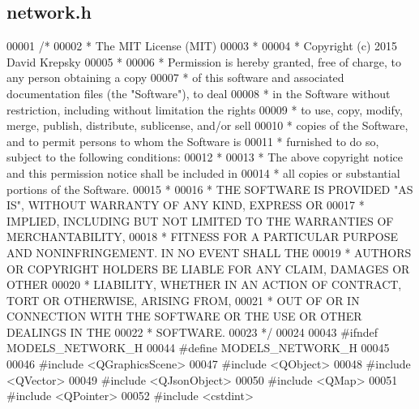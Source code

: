 \hypertarget{network_8h_source}{}\subsection{network.\+h}
\label{network_8h_source}

\begin{DoxyCode}
00001 \textcolor{comment}{/*}
00002 \textcolor{comment}{ * The MIT License (MIT)}
00003 \textcolor{comment}{ *}
00004 \textcolor{comment}{ * Copyright (c) 2015 David Krepsky}
00005 \textcolor{comment}{ *}
00006 \textcolor{comment}{ * Permission is hereby granted, free of charge, to any person obtaining a copy}
00007 \textcolor{comment}{ * of this software and associated documentation files (the "Software"), to deal}
00008 \textcolor{comment}{ * in the Software without restriction, including without limitation the rights}
00009 \textcolor{comment}{ * to use, copy, modify, merge, publish, distribute, sublicense, and/or sell}
00010 \textcolor{comment}{ * copies of the Software, and to permit persons to whom the Software is}
00011 \textcolor{comment}{ * furnished to do so, subject to the following conditions:}
00012 \textcolor{comment}{ *}
00013 \textcolor{comment}{ * The above copyright notice and this permission notice shall be included in}
00014 \textcolor{comment}{ * all copies or substantial portions of the Software.}
00015 \textcolor{comment}{ *}
00016 \textcolor{comment}{ * THE SOFTWARE IS PROVIDED "AS IS", WITHOUT WARRANTY OF ANY KIND, EXPRESS OR}
00017 \textcolor{comment}{ * IMPLIED, INCLUDING BUT NOT LIMITED TO THE WARRANTIES OF MERCHANTABILITY,}
00018 \textcolor{comment}{ * FITNESS FOR A PARTICULAR PURPOSE AND NONINFRINGEMENT. IN NO EVENT SHALL THE}
00019 \textcolor{comment}{ * AUTHORS OR COPYRIGHT HOLDERS BE LIABLE FOR ANY CLAIM, DAMAGES OR OTHER}
00020 \textcolor{comment}{ * LIABILITY, WHETHER IN AN ACTION OF CONTRACT, TORT OR OTHERWISE, ARISING FROM,}
00021 \textcolor{comment}{ * OUT OF OR IN CONNECTION WITH THE SOFTWARE OR THE USE OR OTHER DEALINGS IN THE}
00022 \textcolor{comment}{ * SOFTWARE.}
00023 \textcolor{comment}{ */}
00024 
00043 \textcolor{preprocessor}{#ifndef MODELS\_NETWORK\_H}
00044 \textcolor{preprocessor}{#define MODELS\_NETWORK\_H}
00045 
00046 \textcolor{preprocessor}{#include <QGraphicsScene>}
00047 \textcolor{preprocessor}{#include <QObject>}
00048 \textcolor{preprocessor}{#include <QVector>}
00049 \textcolor{preprocessor}{#include <QJsonObject>}
00050 \textcolor{preprocessor}{#include <QMap>}
00051 \textcolor{preprocessor}{#include <QPointer>}
00052 \textcolor{preprocessor}{#include <cstdint>}

\end{DoxyCode}
